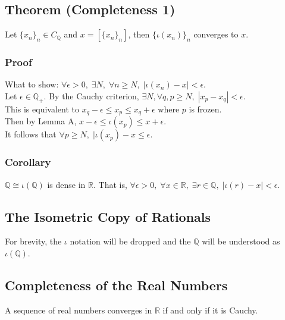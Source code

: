 \documentclass[11pt]{article}
\newcommand{\0}{\emptyset}
\newcommand{\Q}{\mathbb{Q}}
\newcommand{\R}{\mathbb{R}}
\begin{document}
\subsection*{Theorem (Completeness 1)}
\label{sec:org8948d96}
Let \(\{x_{n}\}_{n}\in C_{\Q}\) and \(x=[\{x_{n}\}_{n}]\), then \(\{\iota(x_{n})\}_{n}\) converges to \(x\).\\[0pt]
\subsubsection*{Proof}
\label{sec:orgae49665}
What to show: \(\forall\epsilon>0,\;\exists N,\;\forall n\geq N,\;|\iota(x_{n})-x|<\epsilon\).\\[0pt]
Let \(\epsilon\in\Q_{+}\). By the Cauchy criterion, \(\exists N,\forall q,p\geq N,\;|x_{p}-x_{q}|<\epsilon\).\\[0pt]
This is equivalent to \(x_{q}-\epsilon\leq x_{p}\leq x_{q}+\epsilon\) where \(p\) is frozen.\\[0pt]
Then by Lemma A, \(x-\epsilon\leq \iota(x_{p})\leq x+\epsilon\).\\[0pt]
It follows that \(\forall p\geq N,\;|\iota(x_{p})-x\leq\epsilon\).\\[0pt]
\subsubsection*{Corollary}
\label{sec:orgf10bee0}
\(\Q\cong\iota(\Q)\) is dense in \(\R\). That is, \(\forall\epsilon>0,\;\forall x\in\R,\;\exists r\in\Q,\;|\iota(r)-x|<\epsilon\).\\[0pt]
\subsection*{The Isometric Copy of Rationals}
\label{sec:org066382d}
For brevity, the \(\iota\) notation will be dropped and the \(\Q\) will be understood as \(\iota(\Q)\).\\[0pt]
\subsection*{Completeness of the Real Numbers}
\label{sec:org4f1f137}
A sequence of real numbers converges in \(\R\)  if and only if it is Cauchy.\\[0pt]
\end{document}

